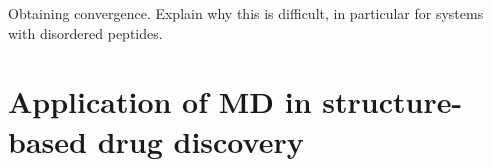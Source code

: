 Obtaining convergence. Explain why this is difficult, in particular for systems with disordered peptides.			


\section{Application of MD in structure-based drug discovery}

